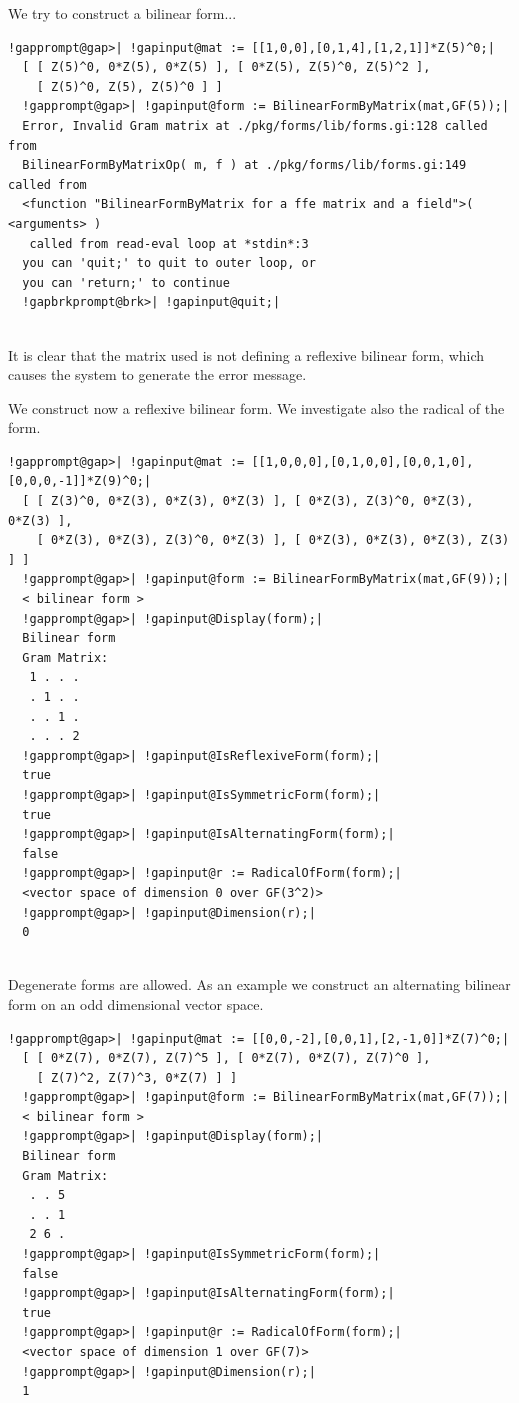 \documentclass[a4paper,11pt]{report}
\begin{document}
{{{ We try to construct a bilinear form... 
\begin{Verbatim}[commandchars=!@|,fontsize=\small,frame=single,label=Example]
  !gapprompt@gap>| !gapinput@mat := [[1,0,0],[0,1,4],[1,2,1]]*Z(5)^0;|
  [ [ Z(5)^0, 0*Z(5), 0*Z(5) ], [ 0*Z(5), Z(5)^0, Z(5)^2 ], 
    [ Z(5)^0, Z(5), Z(5)^0 ] ]
  !gapprompt@gap>| !gapinput@form := BilinearFormByMatrix(mat,GF(5));|
  Error, Invalid Gram matrix at ./pkg/forms/lib/forms.gi:128 called from
  BilinearFormByMatrixOp( m, f ) at ./pkg/forms/lib/forms.gi:149 called from
  <function "BilinearFormByMatrix for a ffe matrix and a field">( <arguments> )
   called from read-eval loop at *stdin*:3
  you can 'quit;' to quit to outer loop, or
  you can 'return;' to continue
  !gapbrkprompt@brk>| !gapinput@quit;|
   
\end{Verbatim}
 It is clear that the matrix used is not defining a reflexive bilinear form,
which causes the system to generate the error message. 

 We construct now a reflexive bilinear form. We investigate also the radical of
the form. 
\begin{Verbatim}[commandchars=!@|,fontsize=\small,frame=single,label=Example]
  !gapprompt@gap>| !gapinput@mat := [[1,0,0,0],[0,1,0,0],[0,0,1,0],[0,0,0,-1]]*Z(9)^0;|
  [ [ Z(3)^0, 0*Z(3), 0*Z(3), 0*Z(3) ], [ 0*Z(3), Z(3)^0, 0*Z(3), 0*Z(3) ], 
    [ 0*Z(3), 0*Z(3), Z(3)^0, 0*Z(3) ], [ 0*Z(3), 0*Z(3), 0*Z(3), Z(3) ] ]
  !gapprompt@gap>| !gapinput@form := BilinearFormByMatrix(mat,GF(9));|
  < bilinear form >
  !gapprompt@gap>| !gapinput@Display(form);|
  Bilinear form
  Gram Matrix:
   1 . . .
   . 1 . .
   . . 1 .
   . . . 2
  !gapprompt@gap>| !gapinput@IsReflexiveForm(form);|
  true
  !gapprompt@gap>| !gapinput@IsSymmetricForm(form);|
  true
  !gapprompt@gap>| !gapinput@IsAlternatingForm(form);|
  false
  !gapprompt@gap>| !gapinput@r := RadicalOfForm(form);|
  <vector space of dimension 0 over GF(3^2)>
  !gapprompt@gap>| !gapinput@Dimension(r);|
  0
   
\end{Verbatim}
 

 Degenerate forms are allowed. As an example we construct an alternating
bilinear form on an odd dimensional vector space. 
\begin{Verbatim}[commandchars=!@|,fontsize=\small,frame=single,label=Example]
  !gapprompt@gap>| !gapinput@mat := [[0,0,-2],[0,0,1],[2,-1,0]]*Z(7)^0;|
  [ [ 0*Z(7), 0*Z(7), Z(7)^5 ], [ 0*Z(7), 0*Z(7), Z(7)^0 ], 
    [ Z(7)^2, Z(7)^3, 0*Z(7) ] ]
  !gapprompt@gap>| !gapinput@form := BilinearFormByMatrix(mat,GF(7));|
  < bilinear form >
  !gapprompt@gap>| !gapinput@Display(form);|
  Bilinear form
  Gram Matrix:
   . . 5
   . . 1
   2 6 .
  !gapprompt@gap>| !gapinput@IsSymmetricForm(form);|
  false
  !gapprompt@gap>| !gapinput@IsAlternatingForm(form);|
  true
  !gapprompt@gap>| !gapinput@r := RadicalOfForm(form);|
  <vector space of dimension 1 over GF(7)>
  !gapprompt@gap>| !gapinput@Dimension(r);|
  1
   

\end{Verbatim}}}}
\end{document}
